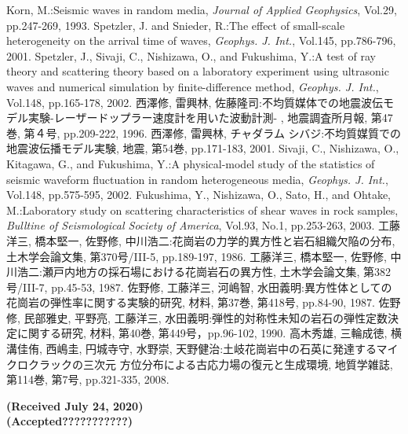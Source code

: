 \documentclass{jsce}
\begin{document}
\begin{thebibliography}{99}
\begin{spacing}{1.175}
	Korn, M.:Seismic waves in random media, 
	{\it Journal of Applied Geophysics}, Vol.29, pp.247-269, 1993.
	Spetzler, J. and Snieder, R.:The effect of small-scale heterogeneity on the arrival time of waves, 
	{\it Geophys. J. Int.}, Vol.145, pp.786-796, 2001. 
	Spetzler, J., Sivaji, C., Nishizawa, O., and Fukushima, Y.:A test of ray theory and scattering theory based on
	a laboratory experiment using ultrasonic waves and numerical 
\lastpagecontrol[0.0cm]{9.0cm}
\newpage
	simulation by finite-difference method, 
	{\it Geophys. J. Int.}, Vol.148, pp.165-178, 2002. 
	西澤修, 雷興林, 佐藤隆司:不均質媒体での地震波伝モデル実験-レーザードップラー速度計を用いた波動計測-
	, 地震調査所月報, 第47巻, 第４号, pp.209-222, 1996.
	西澤修, 雷興林, チャダラム シバジ:不均質媒質での地震波伝播モデル実験, 
	地震, 第54巻, pp.171-183, 2001.
	Sivaji, C., Nishizawa, O., Kitagawa, G., and Fukushima, Y.:A physical-model study of the statistics of seismic waveform fluctuation in random heterogeneous media, 
	{\it Geophys. J. Int.}, Vol.148, pp.575-595, 2002. 
	Fukushima, Y., Nishizawa, O., Sato, H., and Ohtake, M.:Laboratory study on scattering characteristics of shear waves 
	in rock samples, {\it Bulltine of Seismological Society of America}, Vol.93, No.1, pp.253-263, 2003.
	工藤洋三, 橋本堅一, 佐野修, 中川浩二:花崗岩の力学的異方性と岩石組織欠陥の分布,
	土木学会論文集, 第370号/III-5, pp.189-197, 1986.
	工藤洋三, 橋本堅一, 佐野修, 中川浩二:瀬戸内地方の採石場における花崗岩石の異方性, 
	土木学会論文集, 第382号/III-7, pp.45-53, 1987.
	佐野修, 工藤洋三, 河嶋智, 水田義明:異方性体としての花崗岩の弾性率に関する実験的研究, 
	材料, 第37巻, 第418号, pp.84-90, 1987.
	佐野修, 民部雅史, 平野亮, 工藤洋三, 水田義明:弾性的対称性未知の岩石の弾性定数決定に関する研究, 
	材料, 第40巻, 第449号，pp.96-102, 1990.
	高木秀雄, 三輪成徳, 横溝佳侑, 西嶋圭, 円城寺守, 水野崇, 天野健治:土岐花崗岩中の石英に発達するマイクロクラックの三次元
	方位分布による古応力場の復元と生成環境, 地質学雑誌, 第114巻, 第7号, pp.321-335, 2008.
\end{spacing}
\end{thebibliography}
\begin{flushright}
	\small
	\bf{ (Received July 24, 2020)\\
	(Accepted???????????)}
\end{flushright}
\end{document}
